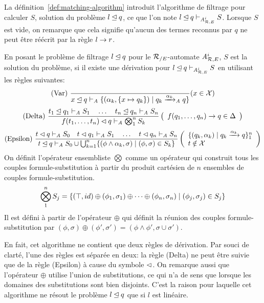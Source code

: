 La définition~\ref{def:matching-algorithm} introduit l'algorithme de filtrage pour calculer $S$, solution du problème $l \unlhd q$,
ce que l'on note $l \unlhd q \vdash_{{\mathit A}_{\mathcal R,E}^i} S$. Lorsque $S$ est vide, on remarque que cela signifie 
qu'aucun des termes reconnus par $q$ ne peut être réécrit par la règle $l \rightarrow r$.


\begin{definition}
  \label{def:matching-algorithm}
  En posant le problème de filtrage $l \unlhd q$ pour le ${\mathcal R_{/E}}$-automate ${\mathit A}_{\mathcal R,E}^i$,
  $S$ est la solution du problème, si il existe une dérivation pour 
  $l \unlhd q \vdash_{{\mathit A}_{\mathcal R,E}^i} S$ en utilisant les règles suivantes:
  {\footnotesize
    \[\textrm{(Var) }
    \dfrac{}
    {x \unlhd q \vdash_\mathit A \{(\alpha_k, \{x \mapsto q_k\}) \; | \; q_k \xrightarrow{\alpha_k}_\mathit A q\}}
    (x \in \mathcal X)
    \]
    \[\textrm{(Delta) }
    \dfrac{
      t_1 \unlhd q_1 \vdash_\mathit A S_1
      \quad \dots \quad
      t_n \unlhd q_n \vdash_\mathit A S_n
    }{f(t_1, \dots, t_n) \lhd q \vdash_\mathit A \bigotimes_1^n S_k
    }\left(
      \begin{array}{l}
        f(q_1, \dots, q_n) \rightarrow q \in \Delta\\
      \end{array}
    \right )
    \]
    \[\textrm{(Epsilon) }
    \dfrac{ 
      t \matchi q    \vdash_\A S_0   \quad
      t \matchi q_1 \vdash_\A S_1 \quad \dots \quad
      t \matchi q_n \vdash_\A S_n
    }{
      t \match q \vdash_\A S_0 \cup
      \bigcup_{k=1}^n \{(\phi \land \alpha_k, \sigma) \sep (\phi, \sigma) \in S_k\}
    }\left(
      \begin{array}{l}
        \{(q_k, \alpha_k) \sep q_k \xrw{\alpha_k} q\}_1^n\\%
        t \notin \X\\
      \end{array}
    \right)
    \]
  }
  On définit l'opérateur ensembliste $\bigotimes$ comme un opérateur qui
  construit tous les couples formule-substitution à partir du produit cartésien
  de $n$ ensembles de couples formule-substitution.
  \[\bigotimes_1^n S_j = \{ (\top, id) \oplus (\phi_1, \sigma_1) \oplus \dots \oplus (\phi_n, \sigma_n) \; | \; (\phi_j,\sigma_j) \in S_j\}\]
  Il est défini à partir de l'opérateur $\oplus$ qui définit la réunion des couples formule-substitution par
  $(\phi, \sigma) \oplus (\phi', \sigma') = (\phi \land \phi',\sigma \cup \sigma')$.
\end{definition}
En fait, cet algorithme ne contient que deux règles de dérivation. Par souci de clarté, l'une des règles est séparée en deux:
la règle (Delta) ne peut être suivie que de la règle (Epsilon) à cause du symbole $\lhd$. On remarque aussi que l'opérateur $\oplus$
utilise l'union de substitutions, ce qui n'a de sens que lorsque les domaines des substitutions sont bien disjoints. C'est la raison
pour laquelle cet algorithme ne résout le problème $l \unlhd q$ que si $l$ est linéaire.

